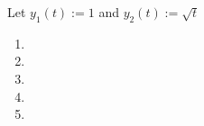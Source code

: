 Let $y_1(t) := 1$ and $y_2(t) := \sqrt{t}$
\begin{enumerate}[label=(\alph*)]
    \item 
    \item 
    \item 
    \item 
    \item 
\end{enumerate}